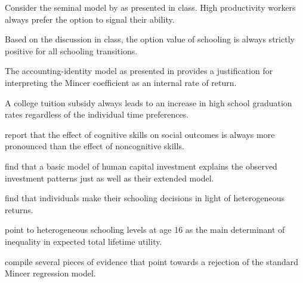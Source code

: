 \begin{boenumerate}
\item Consider the seminal model by \cite{Spence.1973} as presented in class. High productivity workers always prefer the option to signal their ability.

\item Based on the discussion in class, the option value of schooling is always strictly positive for all schooling transitions.

\item The accounting-identity model as presented in \cite{Heckman.2006a} provides a justification for interpreting the Mincer coefficient as an internal rate of return.

\item A college tuition subsidy always leads to an increase in high school graduation rates regardless of the individual time preferences.

\item \cite{Heckman.2006b} report that the effect of cognitive skills on social outcomes is always more pronounced than the effect of noncognitive skills.

\item \cite{Keane.1997} find that a basic model of human capital investment explains the observed investment patterns just as well as their extended model.

\item \cite{Carneiro.2011} find that individuals make their schooling decisions in light of heterogeneous returns.

\item \cite{Keane.1997} point to heterogeneous schooling levels at age 16 as the main determinant of inequality in expected total lifetime utility.

\item \cite{Heckman.2006a} compile several pieces of evidence that point towards a rejection of the standard Mincer regression model.
\end{boenumerate}
